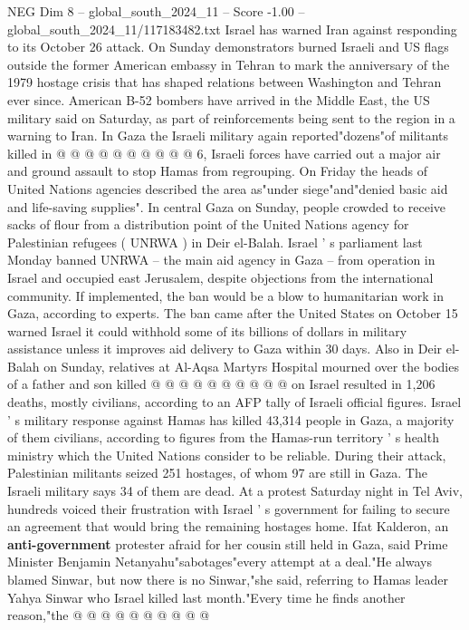 \begin{textsample}{NEG Dim 8 – global\_south\_2024\_11 – Score -1.00 – global\_south\_2024\_11/117183482.txt}
Israel has warned Iran against responding to its October 26 attack.
On Sunday demonstrators burned Israeli and US flags outside the former American embassy in Tehran to mark the anniversary of the 1979 hostage crisis that has shaped relations between Washington and Tehran ever since.
American B-52 bombers have arrived in the Middle East, the US military said on Saturday, as part of reinforcements being sent to the region in a warning to Iran.
In Gaza the Israeli military again reported"dozens"of militants killed in @ @ @ @ @ @ @ @ @ @ 6, Israeli forces have carried out a major air and ground assault to stop Hamas from regrouping.
On Friday the heads of United Nations agencies described the area as"under siege"and"denied basic aid and life-saving supplies".
In central Gaza on Sunday, people crowded to receive sacks of flour from a distribution point of the United Nations agency for Palestinian refugees ( UNRWA ) in Deir el-Balah.
Israel ' s parliament last Monday banned UNRWA -- the main aid agency in Gaza -- from operation in Israel and occupied east Jerusalem, despite objections from the international community.
If implemented, the ban would be a blow to humanitarian work in Gaza, according to experts.
The ban came after the United States on October 15 warned Israel it could withhold some of its billions of dollars in military assistance unless it improves aid delivery to Gaza within 30 days.
Also in Deir el-Balah on Sunday, relatives at Al-Aqsa Martyrs Hospital mourned over the bodies of a father and son killed @ @ @ @ @ @ @ @ @ @ on Israel resulted in 1,206 deaths, mostly civilians, according to an AFP tally of Israeli official figures.
Israel ' s military response against Hamas has killed 43,314 people in Gaza, a majority of them civilians, according to figures from the Hamas-run territory ' s health ministry which the United Nations consider to be reliable.
During their attack, Palestinian militants seized 251 hostages, of whom 97 are still in Gaza.
The Israeli military says 34 of them are dead.
At a protest Saturday night in Tel Aviv, hundreds voiced their frustration with Israel ' s government for failing to secure an agreement that would bring the remaining hostages home.
Ifat Kalderon, an \textbf{anti-government} protester afraid for her cousin still held in Gaza, said Prime Minister Benjamin Netanyahu"sabotages"every attempt at a deal."He always blamed Sinwar, but now there is no Sinwar,"she said, referring to Hamas leader Yahya Sinwar who Israel killed last month."Every time he finds another reason,"the @ @ @ @ @ @ @ @ @ @

\end{textsample}

